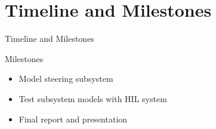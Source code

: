 \documentclass{beamer}
\begin{document}
\section{Timeline and Milestones}

\begin{frame}{Timeline and Milestones}
  \begin{block}{Milestones}
 \begin{itemize}
        \item Model steering subsystem 
	\item Test subsystem models with HIL system 
	\item Final report and presentation 
\end{itemize}
  \end{block}
\end{frame}



\end{document}
